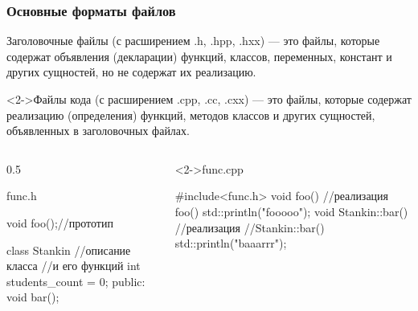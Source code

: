 \documentclass[9pt, aspectratio=1610]{beamer}
\begin{document}
\begin{frame}[fragile]\frametitle{Основные форматы файлов}
	
	\begin{alertblock}{Заголовочные файлы (с расширением .h, .hpp, .hxx) ---}
		это файлы, которые содержат объявления (декларации) функций, классов, переменных, констант и других сущностей, но не содержат их реализацию.
	\end{alertblock}	
	
	\smallskip
	
	\begin{alertblock}<2->{Файлы кода (с расширением .cpp, .cc, .cxx) ---}
		это файлы, которые содержат реализацию (определения) функций, методов классов и других сущностей, объявленных в заголовочных файлах.
	\end{alertblock}
	
	
	
	\vspace*{-\baselineskip}
	\begin{columns}[]
		\edef\colA{0.5}
		\begin{column}[t]{\colA\linewidth}
			\begin{block}{func.h}
				\begin{cppcode}
					void foo();//прототип
					
					class Stankin //описание класса
					{             //и его функций 
						int students_count = 0;
						public:
						void bar();
					}
				\end{cppcode}
			\end{block}
		\end{column}
		\begin{column}[t]{\fpeval{1-\colA}\linewidth}
			\begin{block}<2->{func.cpp}
				\begin{cppcode}
					#include<func.h>
					void foo() //реализация foo()
					{
						std::println("fooooo");
					}					
					void Stankin::bar() //реализация 
					{                   //Stankin::bar()
						std::println("baaarrr");
					}
				\end{cppcode}
			\end{block}
		\end{column}
	\end{columns}
	
	
	
\end{frame}
\end{document}

